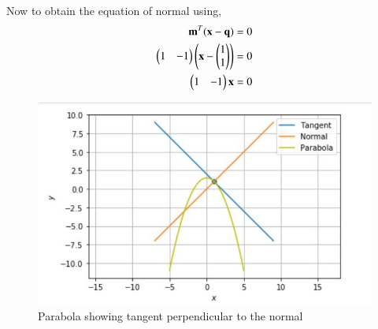 \documentclass[journal,12pt,twocolumn]{IEEEtran}
\begin{document}
Now to obtain the equation of normal using,
\begin{align}
    \mathbf{m}^T(\mathbf{x} - \mathbf{q}) &= 0 \\
    \begin{pmatrix}1 & -1\end{pmatrix}\begin{pmatrix}\mathbf{x} - \begin{pmatrix}1 \\ 1\end{pmatrix}\end{pmatrix} &= 0 \\
    \begin{pmatrix}1 & -1\end{pmatrix}\mathbf{x} &= 0 
\end{align}
\begin{figure}[h!]
\centering
\includegraphics[width=\columnwidth]{Plot.JPG}
\caption{{Parabola showing tangent perpendicular to the normal}}
\label{myfig}
\end{figure}
\end{document}
